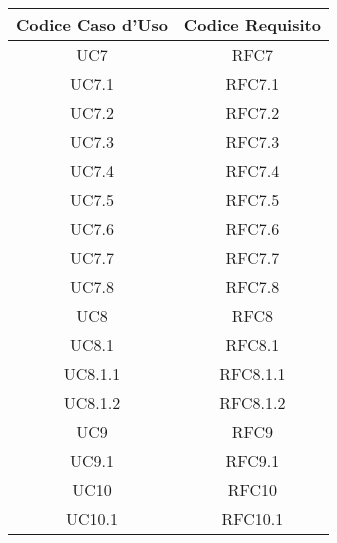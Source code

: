         \begin{table}[!htbp] %
            \centering
            \renewcommand{\arraystretch}{2} %
                \begin{tabular}{|c|c|} %
                \rowcolor{orange!50} %
        		\hline
        		\textbf{Codice Caso d'Uso} & \textbf{Codice Requisito} \\
                \hline
                UC7 & RFC7\\
                \hline
                UC7.1 & RFC7.1\\
                \hline
                UC7.2 & RFC7.2\\
                \hline
                UC7.3 & RFC7.3\\
                \hline
                UC7.4 & RFC7.4\\
                \hline
                UC7.5 & RFC7.5\\
                \hline
                UC7.6 & RFC7.6\\
                \hline
                UC7.7 & RFC7.7\\
                \hline
                UC7.8 & RFC7.8\\
                \hline
                UC8 & RFC8\\
                \hline
                UC8.1 & RFC8.1\\
                \hline
                UC8.1.1 & RFC8.1.1\\
                \hline
                UC8.1.2 & RFC8.1.2\\
                \hline
                UC9 & RFC9\\
                \hline
                UC9.1 & RFC9.1\\
                \hline
                UC10 & RFC10\\
                \hline
                UC10.1 & RFC10.1\\
                \hline
            \end{tabular}
        \end{table}
